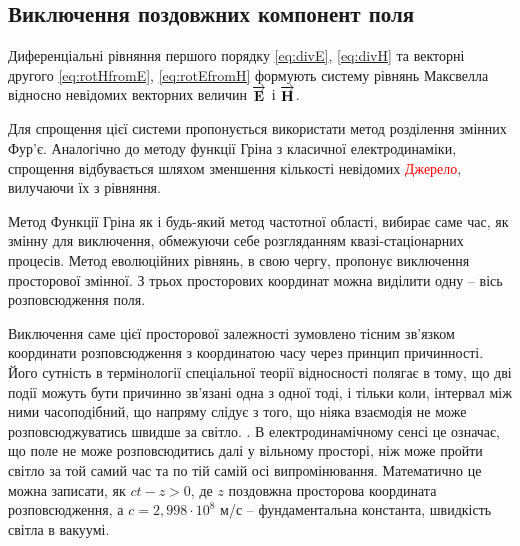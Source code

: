 \subsection{Виключення поздовжних компонент поля}

Диференціальні рівняння першого порядку \eqref{eq:divE}, \eqref{eq:divH} та 
векторні другого \eqref{eq:rotHfromE}, \eqref{eq:rotEfromH} формують систему 
рівнянь Максвелла відносно невідомих векторних величин $ \overrightarrow{\mathbf E} $ і 
$ \overrightarrow{\mathbf H} $.

Для спрощення цієї системи пропонується використати метод розділення змінних
Фур'є. Аналогічно до методу функції Гріна з класичної електродинаміки, 
спрощення відбувається шляхом зменшення кількості невідомих 
\textcolor{red}{Джерело}, вилучаючи їх з рівняння. 

Метод Функції Гріна як і будь-який метод частотної області, вибирає саме час, 
як змінну для виключення, обмежуючи себе розгляданням квазі-стаціонарних 
процесів. Метод еволюційних рівнянь, в свою чергу, пропонує виключення 
просторової змінної. З трьох просторових координат можна виділити одну -- вісь 
розповсюдження поля. 

Виключення саме цієї просторової залежності зумовлено тісним зв'язком 
координати розповсюдження з координатою часу через принцип причинності. Його 
сутність в термінології спеціальної теорії відносності полягає в тому, що дві 
події можуть бути причинно зв'язані одна з одної тоді, і тільки коли, інтервал 
між ними часоподібний, що напряму слідує з того, що ніяка взаємодія не може 
розповсюджуватись швидше за світло. \cite[ст. 22]{LandauII}. В 
електродинамічному сенсі це означає, що поле не може розповсюдитись далі у 
вільному просторі, ніж може пройти світло за той самий час та по тій самій осі 
випромінювання. Математично це можна записати, як $ ct - z > 0 $, де $ z $
поздовжна просторова координата розповсюдження, а $ c = 2,998 \cdot 10^8 $ м/с 
-- фундаментальна константа, швидкість світла в вакуумі.

